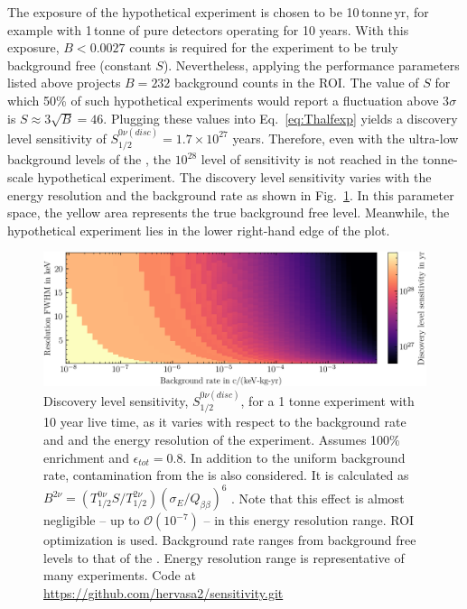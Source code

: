 The exposure of the hypothetical experiment is chosen to be 10\,tonne\,yr, for example with 1\,tonne of pure \geEn{} detectors operating for 10 years. With this exposure, $B < 0.0027$ counts is required for the experiment to be truly background free (constant $S$). Nevertheless, applying the performance parameters listed above projects $B = 232$ background counts in the ROI. The value of $S$ for which 50\% of such hypothetical experiments would report a fluctuation above 3$\sigma$ is $S \approx 3\sqrt B =  46$. Plugging these values into Eq.~\ref{eq:Thalfexp} yields a discovery level sensitivity of $S^{0\nu(disc)}_{1/2} = 1.7 \times 10^{27}$ years. Therefore, even with the ultra-low background levels of the {\DEMit}, the $10^{28}$ level of sensitivity is not reached in the tonne-scale hypothetical experiment. The discovery level sensitivity varies with the energy resolution and the background rate as shown in Fig.~\ref{fig:sensitivity_disc}. In this parameter space, the yellow area represents the true background free level. Meanwhile, the hypothetical experiment lies in the lower right-hand edge of the plot. 
\begin{figure}[htb]
	\centering
	\includegraphics[width=6in]{figs/0vbb/discovery_sensitivity.png}
	\caption{Discovery level sensitivity, $S^{0\nu(disc)}_{1/2}$, for a 1 tonne \geEn{} experiment with 10 year live time, as it varies with respect to the background rate and and the energy resolution of the experiment. Assumes 100\% enrichment and $\epsilon_{tot} = 0.8$. In addition to the uniform background rate, contamination from the \twovbb{} is also considered. It is calculated as $B^{2\nu}= (T^{0\nu}_{1/2} S/T^{2\nu}_{1/2})( \sigma_E/Q_{\beta\beta})^6$ \cite{2vbb_background}. Note that this effect is almost negligible -- up to $\mathcal{O}(10^{-7})$ -- in this energy resolution range. ROI optimization is used. Background rate ranges from background free levels to that of the {\MJDEMit}. Energy resolution range is representative of many \novbb{} experiments. Code at \url{https://github.com/hervasa2/sensitivity.git}}
	\label{fig:sensitivity_disc}
\end{figure}

